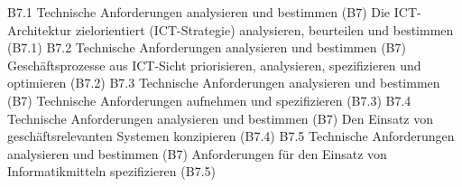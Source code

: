 \templateCard
  {B7.1}
  {Technische Anforderungen analysieren und bestimmen (B7)}
  {Die ICT-Architektur zielorientiert (ICT-Strategie) analysieren, beurteilen und bestimmen (B7.1)}
\templateCard
  {B7.2}
  {Technische Anforderungen analysieren und bestimmen (B7)}
  {Geschäftsprozesse aus ICT-Sicht priorisieren, analysieren, spezifizieren und optimieren (B7.2)}
\templateCard
  {B7.3}
  {Technische Anforderungen analysieren und bestimmen (B7)}
  {Technische Anforderungen aufnehmen und spezifizieren (B7.3)}
\templateCard
  {B7.4}
  {Technische Anforderungen analysieren und bestimmen (B7)}
  {Den Einsatz von geschäftsrelevanten Systemen konzipieren (B7.4)}
\templateCard
  {B7.5}
  {Technische Anforderungen analysieren und bestimmen (B7)}
  {Anforderungen für den Einsatz von Informatikmitteln spezifizieren (B7.5)}
